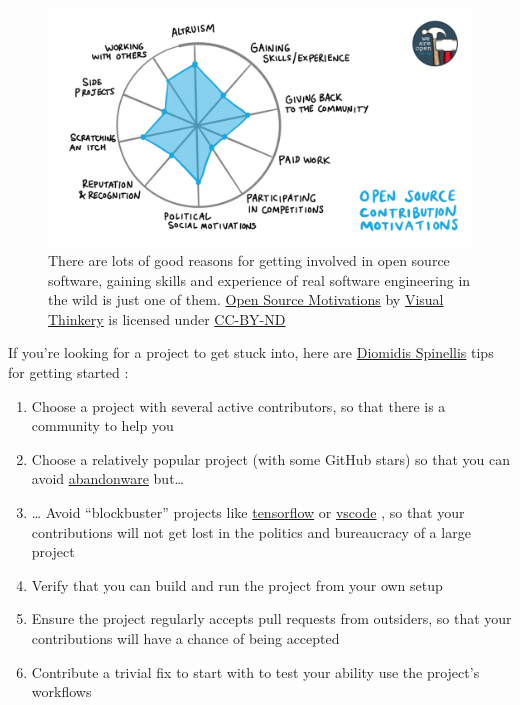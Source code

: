 \documentclass[
]{book}
\providecommand{\tightlist}{%
  \setlength{\itemsep}{0pt}\setlength{\parskip}{0pt}}
\begin{document}
\begin{figure}

{\centering \includegraphics[width=1\linewidth]{images/OS-contribution-motivations-1200x675} 

}

\caption{There are lots of good reasons for getting involved in open source software, gaining skills and experience of real software engineering in the wild is just one of them. \href{https://bryanmmathers.com/open-source-motivations}{Open Source Motivations} by \href{https://visualthinkery.com}{Visual Thinkery} is licensed under \href{https://creativecommons.org/licenses/by-nd/4.0/}{CC-BY-ND}}\label{fig:opensource-fig}
\end{figure}



If you're looking for a project to get stuck into, here are \href{https://en.wikipedia.org/wiki/Diomidis_Spinellis}{Diomidis Spinellis} tips for getting started \citep{Spinellis}:

\begin{enumerate}
\def\labelenumi{\arabic{enumi}.}
\tightlist
\item
  Choose a project with several active contributors, so that there is a community to help you
\item
  Choose a relatively popular project (with some GitHub stars) so that you can avoid \href{https://en.wikipedia.org/wiki/Abandonware}{abandonware} but\ldots{}
\item
  \ldots{} Avoid ``blockbuster'' projects like \href{https://github.com/tensorflow}{tensorflow} or \href{https://github.com/microsoft/vscode}{vscode} , so that your contributions will not get lost in the politics and bureaucracy of a large project
\item
  Verify that you can build and run the project from your own setup
\item
  Ensure the project regularly accepts pull requests from outsiders, so that your contributions will have a chance of being accepted
\item
  Contribute a trivial fix to start with to test your ability use the project's workflows
\end{enumerate}
\end{document}
